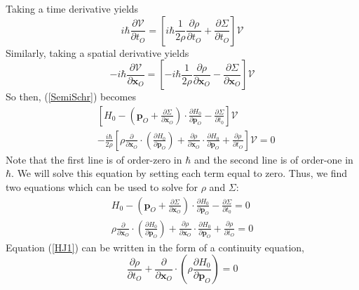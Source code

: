 Taking a time derivative yields
\begin{equation}
	i \hbar \frac{\partial \mathcal{V}}{\partial t_{O}} = \left[ i \hbar \frac{1}{2 \rho} \frac{\partial \rho}{\partial t_{O}} + \frac{\partial \Sigma}{\partial t_{O}} \right] \mathcal{V}
\end{equation}
Similarly, taking a spatial derivative yields
\begin{equation}
	{-i \hbar} \frac{\partial \mathcal{V}}{\partial \mathbf{x}_{O}} = \left[ -i \hbar \frac{1}{2 \rho} \frac{\partial \rho}{\partial \mathbf{x}_{O}} - \frac{\partial \Sigma}{\partial \mathbf{x}_{O}} \right] \mathcal{V}
\end{equation}
So then, (\ref{SemiSchr}) becomes
\begin{equation}
\begin{split}
	{}& \left[ H_{0} - \left( \mathbf{p}_{O} + \frac{\partial \Sigma}{\partial \mathbf{x}_{O}} \right) \cdot \frac{\partial H_{0}}{\partial \mathbf{p}_{O}} - \frac{\partial \Sigma}{\partial t_{0}} \right] \mathcal{V} \\
	{}& {- \frac{i \hbar}{2 \rho} } \left[ \rho \frac{\partial}{\partial \mathbf{x}_{O}} \cdot \left( \frac{\partial H_{0}}{\partial \mathbf{p}_{O}} \right) + \frac{\partial \rho}{\partial \mathbf{x}_{O}} \cdot \frac{\partial H_{0}}{\partial \mathbf{p}_{O}} + \frac{\partial \rho}{\partial t_{O}} \right] \mathcal{V} = 0
\end{split}
\end{equation}
Note that the first line is of order-zero in $\hbar$ and the second line is of order-one in $\hbar$. We will solve this equation by setting each term equal to zero. Thus, we find two equations which can be used to solve for $\rho$ and $\Sigma$:
\begin{align}
	H_{0} - \left( \mathbf{p}_{O} + \frac{\partial \Sigma}{\partial \mathbf{x}_{O}} \right) \cdot \frac{\partial H_{0}}{\partial \mathbf{p}_{O}} - \frac{\partial \Sigma}{\partial t_{0}} = 0 \label{HJ0} \\
	\rho \frac{\partial}{\partial \mathbf{x}_{O}} \cdot \left( \frac{\partial H_{0}}{\partial \mathbf{p}_{O}} \right) + \frac{\partial \rho}{\partial \mathbf{x}_{O}} \cdot \frac{\partial H_{0}}{\partial \mathbf{p}_{O}} + \frac{\partial \rho}{\partial t_{O}} = 0 \label{HJ1}
\end{align}
Equation (\ref{HJ1}) can be written in the form of a continuity equation,
\begin{equation}
	\frac{\partial \rho}{\partial t_{O}} + \frac{\partial}{\partial \mathbf{x}_{O}} \cdot \left( \rho \frac{\partial H_{0}}{\partial \mathbf{p}_{O}} \right) = 0 \label{conti}
\end{equation}

